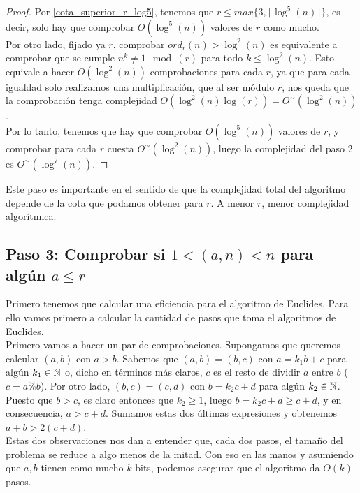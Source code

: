\begin{proof}
	Por \autoref{cota_superior_r_log5}, tenemos que $r \leq max\{3, \lceil \log^5(n) \rceil \}$, es decir, solo hay que comprobar $O(\log^5(n))$ valores de $r$ como mucho.\\
	
	Por otro lado, fijado ya $r$, comprobar $ord_r(n) > \log^2(n)$ es equivalente a comprobar que se cumple $n^k \neq 1 \mod(r)$ para todo $k \leq \log^2(n)$. Esto equivale a hacer $O(\log^2(n))$ comprobaciones para cada $r$, ya que para cada igualdad solo realizamos una multiplicación, que al ser módulo $r$, nos queda que la comprobación tenga complejidad $O(\log^2(n)\log(r)) = O^\sim(\log^2(n))$.\\
	
	Por lo tanto, tenemos que hay que comprobar $O(\log^5(n))$ valores de $r$, y comprobar para cada $r$ cuesta $O^\sim(\log^2(n))$, luego la complejidad del paso 2 es $O^\sim(\log^7(n))$.
\end{proof}

Este paso es importante en el sentido de que la complejidad total del algoritmo depende de la cota que podamos obtener para $r$. A menor $r$, menor complejidad algorítmica.

\subsection{Paso 3: Comprobar si $1 < (a, n) < n$ para algún $a \leq r$}

Primero tenemos que calcular una eficiencia para el algoritmo de Euclides. Para ello vamos primero a calcular la cantidad de pasos que toma el algoritmos de Euclides.\\

Primero vamos a hacer un par de comprobaciones. Supongamos que queremos calcular $(a, b)$ con $a > b$. Sabemos que $(a, b) = (b, c)$ con $a = k_1b + c$ para algún $k_1 \in \mathbb{N}$ o, dicho en términos más claros, $c$ es el resto de dividir $a$ entre $b$ ($c = a \% b$). Por otro lado, $(b, c) = (c, d)$ con $b = k_2c + d$ para algún $k_2 \in \mathbb{N}$.\\

Puesto que $b > c$, es claro entonces que $k_2 \geq 1$, luego $b = k_2c + d \geq c + d$, y en consecuencia, $a > c + d$. Sumamos estas dos últimas expresiones y obtenemos $a + b > 2(c + d)$.\\

Estas dos observaciones nos dan a entender que, cada dos pasos, el tamaño del problema se reduce a algo menos de la mitad. Con eso en las manos y asumiendo que $a, b$ tienen como mucho $k$ bits, podemos asegurar que el algoritmo da $O(k)$ pasos.\\

